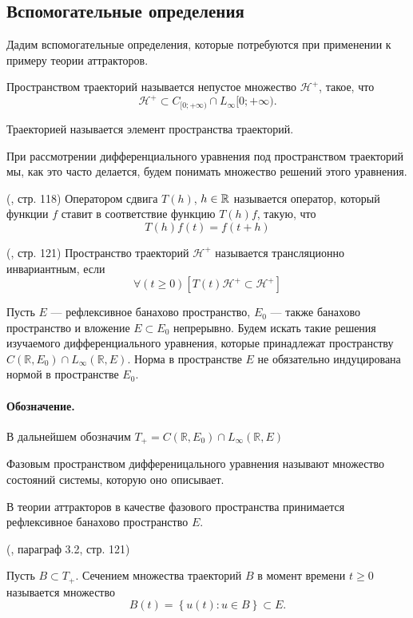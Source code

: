 \subsection*{Вспомогательные определения}

Дадим вспомогательные определения, которые потребуются при применении к примеру теории аттракторов.


\opred
Пространством траекторий называется непустое множество $\mathcal{H}^+$, такое, что
$$
	\mathcal{H}^+ \subset C_{[0;+\infty)} \cap L_\infty{[0;+\infty)}.
$$

\opred
Траекторией называется элемент пространства траекторий.

При рассмотрении дифференциального уравнения под пространством траекторий мы, как это часто делается, будем понимать множество решений этого уравнения.


\opred (\cite{Zelenaya}, стр. 118)
Оператором сдвига $T(h)$, $h\in\mathbb{R}$ называется оператор, который функции $f$ ставит в соответствие функцию $T(h)f$, такую, что
$$
T(h)f(t)=f(t+h)
$$


\opred (\cite{Zelenaya}, стр. 121)
Пространство траекторий $\mathcal{H}^+$ называется трансляционно инвариантным, если
$$
\forall(t \geq 0)\left[T(t)\mathcal{H}^+ \subset \mathcal{H}^+ \right]
$$


Пусть $E$ --- рефлексивное банахово пространство, $E_0$ --- также банахово пространство и вложение $E \subset E_0$ непрерывно.
Будем искать такие решения изучаемого дифференциального уравнения,
которые принадлежат пространству $C(\mathbb{R},E_0) \cap L_\infty(\mathbb{R},E)$.
Норма в пространстве $E$ не обязательно индуцирована нормой в пространстве $E_0$.

\paragraph{Обозначение.}
В дальнейшем обозначим $T_+ = C(\mathbb{R},E_0) \cap L_\infty(\mathbb{R},E)$

\opred
Фазовым пространством дифференицального уравнения называют множество состояний системы, которую оно описывает.

В теории аттракторов в качестве фазового пространства принимается рефлексивное банахово пространство $E$.



\opred (\cite{Zelenaya}, параграф 3.2, стр. 121)

Пусть $B \subset T_+$.
Сечением множества траекторий $B$ в момент времени $t \geq 0$ называется множество
$$
	B(t)=\left\{u(t) : u \in B \right\} \subset E.
$$


